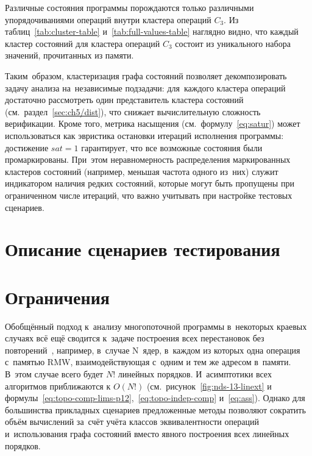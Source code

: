 Различные состояния программы порождаются только различными
упорядочиваниями операций внутри кластера операций $C_3$.
Из таблиц~\ref{tab:cluster-table} и~\ref{tab:full-values-table}
наглядно видно, что каждый кластер
состояний для кластера операций $C_3$ состоит из уникального набора
значений, прочитанных из памяти.

Таким~образом, кластеризация графа состояний позволяет декомпозировать
задачу анализа на~независимые подзадачи: для~каждого кластера операций
достаточно рассмотреть один представитель кластера состояний
(см.~раздел~\ref{sec:ch5/dist}), что снижает
вычислительную сложность верификации. Кроме того, метрика насыщения
(см.~формулу~\ref{eq:satur}) может использоваться как эвристика
остановки итераций исполнения программы: достижение $sat=1$
гарантирует, что все возможные состояния были промаркированы. При~этом
неравномерность распределения маркированных кластеров состояний
(например, меньшая частота одного из~них) служит
индикатором наличия редких состояний, которые могут быть пропущены
при ограниченном числе итераций, что важно учитывать при настройке
тестовых сценариев.

\section{Описание сценариев тестирования}
\label{sec:ch5/usage}


\section{Ограничения}\label{sec:limitations}

Обобщённый подход к~анализу многопоточной программы в~некоторых
краевых случаях всё ещё сводится к~задаче построения всех
перестановок без повторений~\cite{comb-an}, например, в~случае N~ядер,
в~каждом из которых одна операция с~памятью RMW, взаимодействующая
с~одним и тем же адресом в~памяти. В~этом случае всего будет $N!$
линейных порядков. И~асимптотики всех алгоритмов приближаются к
$O(N!)$ (см.~рисунок~\ref{fig:nds-13-linext} и
  формулы~\ref{eq:topo-comp-lims-p12},~\ref{eq:topo-indep-comp}
и~\ref{eq:ass}).
Однако для большинства прикладных сценариев предложенные методы
позволяют сократить объём вычислений за~счёт учёта классов
эквивалентности операций и~использования графа состояний вместо
явного построения всех линейных порядков.

